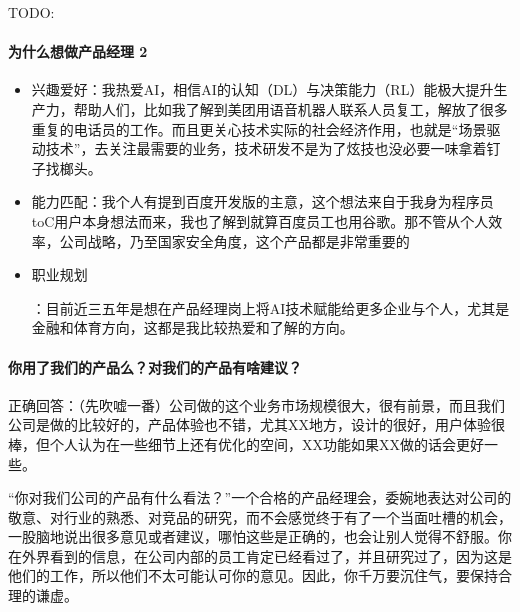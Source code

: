 \documentclass[letterpaper,11pt,english]{sphinxmanual}
\begin{document}
TODO: 


\paragraph{为什么想做产品经理 2\sphinxfootnotemark[795]}
\label{\detokenize{chapter_interview/question:id11}}%
\begin{footnotetext}[795]\sphinxAtStartFootnote
{}
%
\end{footnotetext}\ignorespaces \begin{itemize}
\item {} 
兴趣爱好：我热爱AI，相信AI的认知（DL）与决策能力（RL）能极大提升生产力，帮助人们，比如我了解到美团用语音机器人联系人员复工，解放了很多重复的电话员的工作。而且更关心技术实际的社会经济作用，也就是“场景驱动技术”，去关注最需要的业务，技术研发不是为了炫技也没必要一味拿着钉子找榔头。

\item {} 
能力匹配：我个人有提到百度开发版的主意，这个想法来自于我身为程序员toC用户本身想法而来，我也了解到就算百度员工也用谷歌。那不管从个人效率，公司战略，乃至国家安全角度，这个产品都是非常重要的

\item {} 
职业规划%
\begin{footnote}[796]\sphinxAtStartFootnote
{}
%
\end{footnote}：目前近三五年是想在产品经理岗上将AI技术赋能给更多企业与个人，尤其是金融和体育方向，这都是我比较热爱和了解的方向。

\end{itemize}


\paragraph{你用了我们的产品么？对我们的产品有啥建议？}
\label{\detokenize{chapter_interview/question:id12}}
正确回答：（先吹嘘一番）公司做的这个业务市场规模很大，很有前景，而且我们公司是做的比较好的，产品体验也不错，尤其XX地方，设计的很好，用户体验很棒，但个人认为在一些细节上还有优化的空间，XX功能如果XX做的话会更好一些。

“你对我们公司的产品有什么看法？”一个合格的产品经理会，委婉地表达对公司的敬意、对行业的熟悉、对竞品的研究，而不会感觉终于有了一个当面吐槽的机会，一股脑地说出很多意见或者建议，哪怕这些是正确的，也会让别人觉得不舒服。你在外界看到的信息，在公司内部的员工肯定已经看过了，并且研究过了，因为这是他们的工作，所以他们不太可能认可你的意见。因此，你千万要沉住气，要保持合理的谦虚。
%
\begin{footnote}[797]\sphinxAtStartFootnote
{}
%
\end{footnote}
\end{document}
